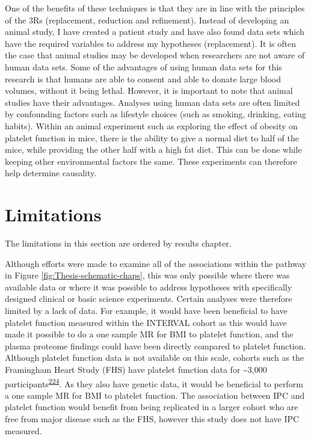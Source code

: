 \documentclass[11pt,twoside]{bristolthesis}
\begin{document}
One of the benefits of these techniques is that they are in line with the principles of the 3Rs (replacement, reduction and refinement). Instead of developing an animal study, I have created a patient study and have also found data sets which have the required variables to address my hypotheses (replacement). It is often the case that animal studies may be developed when researchers are not aware of human data sets. Some of the advantages of using human data sets for this research is that humans are able to consent and able to donate large blood volumes, without it being lethal. However, it is important to note that animal studies have their advantages. Analyses using human data sets are often limited by confounding factors such as lifestyle choices (such as smoking, drinking, eating habits). Within an animal experiment such as exploring the effect of obesity on platelet function in mice, there is the ability to give a normal diet to half of the mice, while providing the other half with a high fat diet. This can be done while keeping other environmental factors the same. These experiments can therefore help determine causality.

\hypertarget{limitations}{%
\section{Limitations}\label{limitations}}

The limitations in this section are ordered by results chapter.

Although efforts were made to examine all of the associations within the pathway in Figure \ref{fig:Thesis-schematic-chaps}, this was only possible where there was available data or where it was possible to address hypotheses with specifically designed clinical or basic science experiments. Certain analyses were therefore limited by a lack of data. For example, it would have been beneficial to have platelet function measured within the INTERVAL cohort as this would have made it possible to do a one sample MR for BMI to platelet function, and the plasma proteome findings could have been directly compared to platelet function. Although platelet function data is not available on this scale, cohorts such as the Framingham Heart Study (FHS) have platelet function data for \textasciitilde3,000 participants\textsuperscript{\protect\hyperlink{ref-Rodriguez2020}{224}}. As they also have genetic data, it would be beneficial to perform a one sample MR for BMI to platelet function. The association between IPC and platelet function would benefit from being replicated in a larger cohort who are free from major disease such as the FHS, however this study does not have IPC measured.
\end{document}
